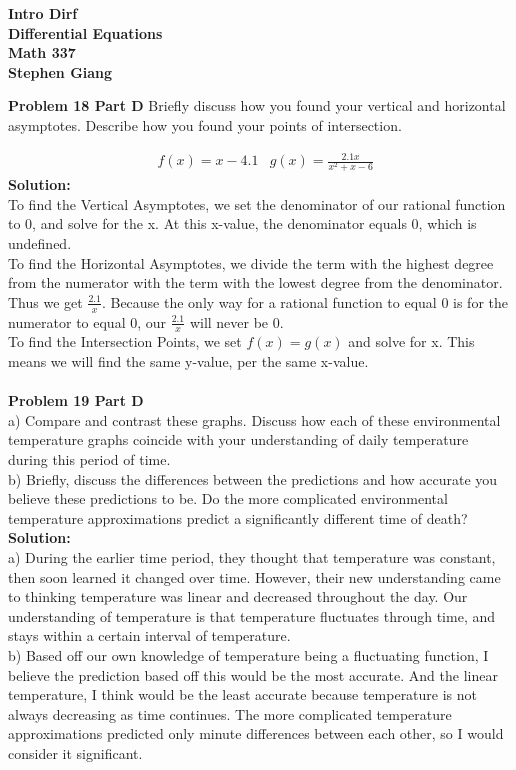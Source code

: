 \documentclass[12pt]{article}
\begin{document}
	
	\begin{center}
		\textbf{Intro Dirf} \\
		\textbf{Differential Equations} \\
		\textbf{Math 337} \\
		\textbf{Stephen Giang} \\
	\end{center}

\textbf{Problem 18 Part D} Briefly discuss how you found your vertical and horizontal asymptotes. Describe how you found your points of intersection.

	\begin{align}
		&f(x) = x - 4.1
		&g(x) = \frac{2.1x}{x^2 + x - 6}
	\end{align}
\textbf{Solution:} \\
To find the Vertical Asymptotes, we set the denominator of our rational function to 0, and solve for the x.  At this x-value, the denominator equals 0, which is undefined.  \\

To find the Horizontal Asymptotes, we divide the term with the highest degree from the numerator with the term with the lowest degree from the denominator.  Thus we get $\frac{2.1}{x}$.  Because the only way for a rational function to equal 0 is for the numerator to equal 0, our $\frac{2.1}{x}$ will never be 0. \\

To find the Intersection Points, we set $f(x) = g(x)$ and solve for x.  This means we will find the same y-value, per the same x-value. \\\\

\textbf{Problem 19 Part D} \\ a) Compare and contrast these graphs. Discuss how each of these environmental temperature graphs coincide with your understanding of daily temperature during this period of time. \\
b) Briefly, discuss the differences between the predictions and how accurate you believe these predictions to be. Do the more complicated environmental temperature approximations predict a significantly different time of death? \\

\textbf{Solution:} \\
a) During the earlier time period, they thought that temperature was constant, then soon learned it changed over time.  However, their new understanding came to thinking temperature was linear and decreased throughout the day.  Our understanding of temperature is that temperature fluctuates through time, and stays within a certain interval of temperature. \\

b) Based off our own knowledge of temperature being a fluctuating function, I believe the prediction based off this would be the most accurate.  And the linear temperature, I think would be the least accurate because temperature is not always decreasing as time continues.  The more complicated temperature approximations predicted only minute differences between each other, so I would consider it significant. 
\end{document}
